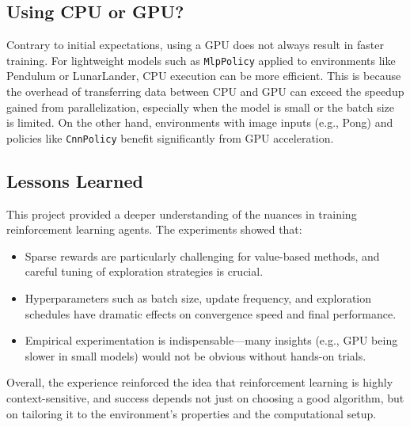 \documentclass[10pt,twocolumn,letterpaper]{article}
\begin{document}
\subsection{Using CPU or GPU?}

Contrary to initial expectations, using a GPU does not always result in faster training. For lightweight models such as \texttt{MlpPolicy} applied to environments like Pendulum or LunarLander, CPU execution can be more efficient. This is because the overhead of transferring data between CPU and GPU can exceed the speedup gained from parallelization, especially when the model is small or the batch size is limited. On the other hand, environments with image inputs (e.g., Pong) and policies like \texttt{CnnPolicy} benefit significantly from GPU acceleration.

\subsection{Lessons Learned}

This project provided a deeper understanding of the nuances in training reinforcement learning agents. The experiments showed that:
\begin{itemize}
  \item Sparse rewards are particularly challenging for value-based methods, and careful tuning of exploration strategies is crucial.
  \item Hyperparameters such as batch size, update frequency, and exploration schedules have dramatic effects on convergence speed and final performance.
  \item Empirical experimentation is indispensable—many insights (e.g., GPU being slower in small models) would not be obvious without hands-on trials.
\end{itemize}

Overall, the experience reinforced the idea that reinforcement learning is highly context-sensitive, and success depends not just on choosing a good algorithm, but on tailoring it to the environment’s properties and the computational setup.

{\small


}
\end{document}
